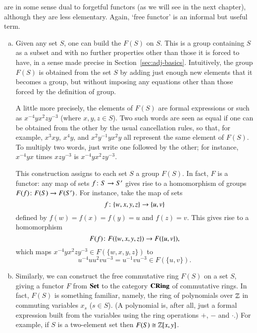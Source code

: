 \begin{examples}        
\label{egs:free-functors}
 are in some sense dual to forgetful functors (as we will see in
the next chapter), although they are less elementary.  Again, `free
functor' is an informal but useful term.

\begin{enumerate}[(b)]
\item 
\label{eg:free-group} 
Given any set $S$, one can build the  $F(S)$ on $S$.  This is a group containing $S$ as a subset and with
no further properties other than those it is forced to have, in a sense
made precise in Section~\ref{sec:adj-basics}.  Intuitively, the group
$F(S)$ is obtained from the set $S$ by adding just enough new elements that
it becomes a group, but without imposing any equations other than those
forced by the definition of group.

A little more precisely, the elements of $F(S)$ are formal expressions or
%
%
%
such as $x^{-4} y x^2 z y^{-3}$ (where $x, y, z \in S$).  Two such words
are seen as equal if one can be obtained from the other by the usual
cancellation rules, so that, for example, $x^3 x y$, $x^4 y$, and $x^2
y^{-1} y x^2 y$ all represent the same element of $F(S)$.  To multiply two
words, just write one followed by the other; for instance, $x^{-4} y x$
times $x z y^{-3}$ is $x^{-4} y x^2 z y^{-3}$.

This construction assigns to each set $S$ a group $F(S)$.  In fact, $F$ is
a functor: any map of sets $f\from S \to S'$ gives rise to a homomorphism
of groups $F(f)\from F(S) \to F(S')$.  For instance, take the map of sets
\[
f\from \{w, x, y, z\} \to \{u, v\}
\]
defined by $f(w) = f(x) = f(y) = u$ and $f(z) = v$.  This gives rise to a
homomorphism 
\[
F(f)\from F(\{w, x, y, z\}) \to F(\{u, v\}),
\]
which maps $x^{-4} y x^2 z y^{-3} \in F(\{w, x, y, z\})$ to 
\[
u^{-4} u u^2 v u^{-3} 
=
u^{-1} v u^{-3}
\in
F(\{u, v\}).
\]

\item 
\label{eg:free-ring} 
Similarly, we can construct the free commutative ring $F(S)$ on a set $S$,
giving a functor $F$ from $\mathbf{Set}$ to the category $\mathbf{CRing}$%
%
%
of commutative rings.  In fact, $F(S)$ is something familiar, namely, the
ring of polynomials%
%
%
over $\mathbb{Z}$ in commuting variables $x_s$ ($s \in S$).  (A polynomial
is, after all, just a formal expression built from the variables using
the ring operations $+$, $-$ and $\cdot$.)  For example, if $S$ is a
two-element set then $F(S) \cong \mathbb{Z}[x, y]$.


\end{enumerate}
\end{examples}
